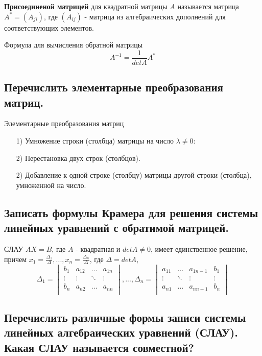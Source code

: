 {\bf{Присоединеной матрицей}} для квадратной матрицы $A$ называется матрица $A^* = (A_{ji})$, где $(A_{ij})$ - матрица из алгебраических дополнений для соответствующих элементов.

Формула для вычисления обратной матрицы
$$A^{-1} = \frac{1}{detA}A^*$$

\vspace*{15pt}
\vspace*{15pt}

\subsection{Перечислить элементарные преобразования матриц.}

Элементарные преобразования матриц
\begin{enumerate}
    \item[1)] Умножение строки (столбца) матрицы на число $\lambda \ne 0$:
    \item[2)] Перестановка двух строк (столбцов).
    \item[2)] Добавление к одной строке (столбцу) матрицы другой строки (столбца), умноженной на число.
\end{enumerate}

\subsection{Записать формулы Крамера для решения системы линейных уравнений с обратимой матрицей.}

СЛАУ $AX = B$, где $A$ - квадратная и $detA \ne 0$, имеет единственное решение, причем $x_1 = \frac{\Delta_1}{\Delta}, ..., x_n = \frac{\Delta_n}{\Delta}$, где $\Delta = detA$,
$$\Delta_1 = 
\begin{vmatrix}
    b_1&a_{12}&\ldots&a_{1n}\\
    \vdots&\vdots&\ddots&\vdots\\
    b_n&a_{n2}&\ldots&a_{nn}\\
\end{vmatrix}, ..., 
\Delta_n = 
\begin{vmatrix}
    a_{11}&\ldots&a_{1n-1}&b_1\\
    \vdots&\ddots&\vdots&\vdots\\
    a_{n1}&\ldots&a_{nn-1}&b_n\\
\end{vmatrix}
$$

\subsection{Перечислить различные формы записи системы линейных алгебраических уравнений (СЛАУ). Какая СЛАУ называется совместной?}

